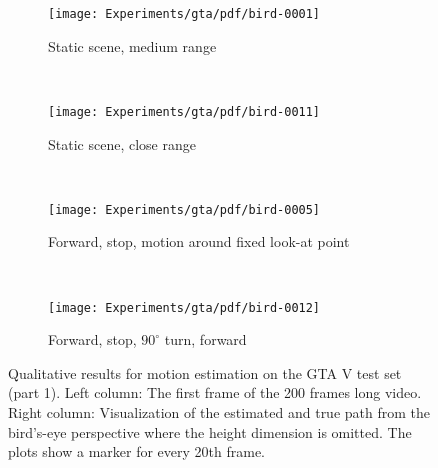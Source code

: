		
		\begin{figure}[h]
			\centering
			\begin{subfigure}[b]{\linewidth}
				\centering
				\texttt{[image: Experiments/gta/pdf/bird-0001]}
				\caption{
					Static scene, medium range
					\label{fig:gtav-qualitative-long-range-with-image}
				}
			\end{subfigure}%
			\\
			\begin{subfigure}[b]{\linewidth}
				\centering
				\texttt{[image: Experiments/gta/pdf/bird-0011]}
				\caption{
					Static scene, close range
					\label{fig:gtav-qualitative-close-range-with-image}
				}
			\end{subfigure}%
			\\
			\begin{subfigure}[b]{\linewidth}
				\centering
				\texttt{[image: Experiments/gta/pdf/bird-0005]}
				\caption{
					Forward, stop, motion around fixed look-at point
					\label{fig:gtav-qualitative-look-at-fixed-with-image}
				}
			\end{subfigure}%
			\\
			\begin{subfigure}[b]{\linewidth}
				\centering
				\texttt{[image: Experiments/gta/pdf/bird-0012]}
				\caption{
					Forward, stop, $90^\circ$ turn, forward
					\label{fig:gtav-qualitative-sharp-turn-with-image}
				}
			\end{subfigure}%
			\caption[Qualitative results for motion estimation on GTA V - Part 1]
					{Qualitative results for motion estimation on the GTA V test set (part 1).
					 Left column: The first frame of the 200 frames long video.
					 Right column: Visualization of the estimated and true path from the bird's-eye perspective where the height dimension is omitted.
					 The plots show a marker for every 20th frame.
					 \label{fig:gtav-qualitative-results-images-and-translation}}
		\end{figure}
		
